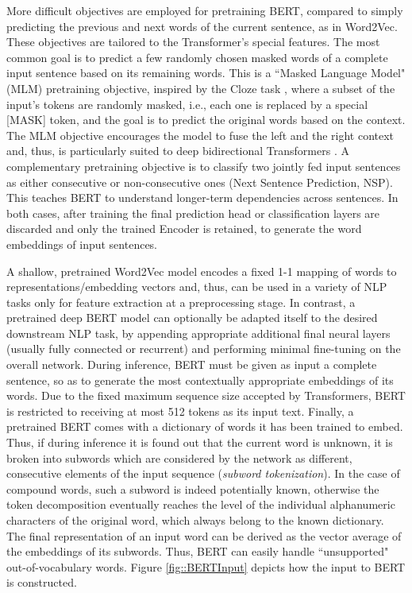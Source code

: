 \documentclass[preprint,review,10pt]{elsarticle}
\begin{document}
	More difficult objectives are employed for pretraining BERT, compared to simply predicting the previous and next words of the current sentence, as in Word2Vec. These objectives are tailored to the Transformer's special features. The most common goal is to predict a few randomly chosen masked words of a complete input sentence based on its remaining words. This is a ``Masked Language Model" (MLM) pretraining objective, inspired by the Cloze task \cite{taylor}, where a subset of the input's tokens are randomly masked, i.e., each one is replaced by a special [MASK] token, and the goal is to predict the original words based on the context. The MLM objective encourages the model to fuse the left and the right context and, thus, is particularly suited to deep bidirectional Transformers \cite{toutanova}. A complementary pretraining objective is to classify two jointly fed input sentences as either consecutive or non-consecutive ones (Next Sentence Prediction, NSP). This teaches BERT to understand longer-term dependencies across sentences. In both cases, after training the final prediction head or classification layers are discarded and only the trained Encoder is retained, to generate the word embeddings of input sentences.
	
	A shallow, pretrained Word2Vec model encodes a fixed 1-1 mapping of words to representations/embedding vectors and, thus, can be used in a variety of NLP tasks only for feature extraction at a preprocessing stage. In contrast, a pretrained deep BERT model can optionally be adapted itself to the desired downstream NLP task, by appending appropriate additional final neural layers (usually fully connected or recurrent) and performing minimal fine-tuning on the overall network. During inference, BERT must be given as input a complete sentence, so as to generate the most contextually appropriate embeddings of its words. Due to the fixed maximum sequence size accepted by Transformers, BERT is restricted to receiving at most 512 tokens as its input text. Finally, a pretrained BERT comes with a dictionary of words it has been trained to embed. Thus, if during inference it is found out that the current word is unknown, it is broken into subwords which are considered by the network as different, consecutive elements of the input sequence (\textit{subword tokenization}). In the case of compound words, such a subword is indeed potentially known, otherwise the token decomposition eventually reaches the level of the individual alphanumeric characters of the original word, which always belong to the known dictionary. The final representation of an input word can be derived as the vector average of the embeddings of its subwords. Thus, BERT can easily handle ``unsupported" out-of-vocabulary words. Figure \ref{fig::BERTInput} depicts how the input to BERT is constructed.
	
\end{document}
